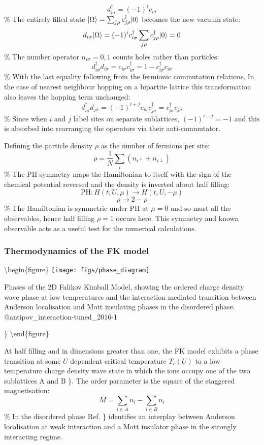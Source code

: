 \[ d^\dagger_{i\sigma} = (-1)^i c_{i\sigma}\] \% The entirely filled
state \(|\Omega\rangle = \sum_{j\rho} c^\dagger_{j\rho} |0\rangle\) becomes
the new vacuum state:
\[d_{i\sigma} |\Omega\rangle = (-1)^i c^\dagger_{i\sigma} \sum_{j\rho} c^\dagger_{j\rho} |0\rangle = 0\]
\% The number operator \(n_{i\sigma} = 0,1\) counts holes rather than
particles:
\[ d^\dagger_{i\sigma} d_{i \sigma} = c_{i\sigma} c^\dagger_{i\sigma} = 1 - c^\dagger_{i\sigma} c_{i\sigma}\]
\% With the last equality following from the fermionic commutation
relations. In the case of nearest neighbour hopping on a bipartite
lattice this transformation also leaves the hopping term unchanged:
\[ d^\dagger_{i\sigma} d_{j \sigma} = (-1)^{i+j} c_{i\sigma} c^\dagger_{j\sigma} = c^\dagger_{i\sigma} c_{j\sigma} \]
\% Since when \(i\) and \(j\) label sites on separate sublattices,
\((-1)^{i-j} = -1\) and this is absorbed into rearranging the operators
via their anti-commutator.

Defining the particle density \(\rho\) as the number of fermions per
site: \[
    \rho = \frac{1}{N} \sum_i \left( n_{i \uparrow} + n_{i \downarrow} \right)
\] \% The PH symmetry maps the Hamiltonian to itself with the sign of
the chemical potential reversed and the density is inverted about half
filling: \[ \text{PH} : H(t, U, \mu) \rightarrow H(t, U, -\mu) \]
\[ \rho \rightarrow 2 - \rho \] \% The Hamiltonian is symmetric under PH
at \(\mu = 0\) and so must all the observables, hence half filling
\(\rho = 1\) occurs here. This symmetry and known observable acts as a
useful test for the numerical calculations.

\hypertarget{thermodynamics-of-the-fk-model}{%
\subsubsection{Thermodynamics of the FK
model}\label{thermodynamics-of-the-fk-model}}

\textbackslash begin\{figure\} \centering
\texttt{[image: figs/phase\_diagram]}

\caption{Phases of the 2D Falikov Kimball Model, showing the ordered charge density wave phase at low temperatures and the interaction mediated transition between Anderson localisation and Mott insulating phases in the disordered phase. @antipov_interaction-tuned_2016-1}

\} \label{fig:FK_phase_diagram} \textbackslash end\{figure\}

At half filling and in dimensions greater than one, the FK model
exhibits a phase transition at some \(U\) dependent critical temperature
\(T_c(U)\) to a low temperature charge density wave state in which the
ions occupy one of the two sublattices A and B
\textcite{maska_thermodynamics_2006-1}\}. The order parameter is the
square of the staggered magnetisation: \[
M = \sum_{i \in A} n_i - \sum_{i \in B} n_i
\] \% In the disordered phase Ref.
\textcite{antipov_interaction-tuned_2016-1}\} identifies an interplay
between Anderson localisation at weak interaction and a Mott insulator
phase in the strongly interacting regime.

